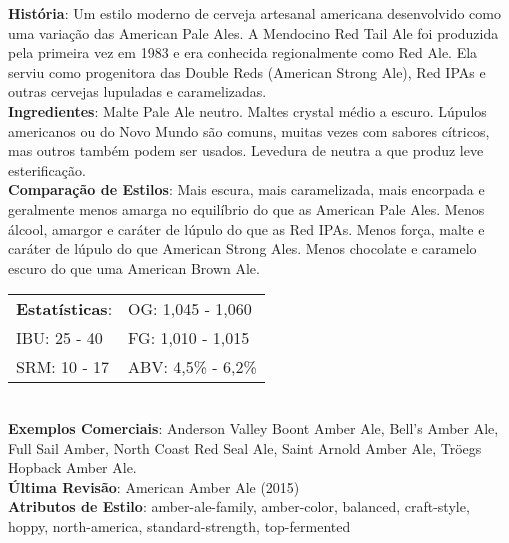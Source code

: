 \textbf{História}: Um estilo moderno de cerveja artesanal americana desenvolvido como uma variação das American Pale Ales. A Mendocino Red Tail Ale foi produzida pela primeira vez em 1983 e era conhecida regionalmente como Red Ale. Ela serviu como progenitora das Double Reds (American Strong Ale), Red IPAs e outras cervejas lupuladas e caramelizadas. \\
\textbf{Ingredientes}: Malte Pale Ale neutro. Maltes crystal médio a escuro. Lúpulos americanos ou do Novo Mundo são comuns, muitas vezes com sabores cítricos, mas outros também podem ser usados. Levedura de neutra a que produz leve esterificação. \\
\textbf{Comparação de Estilos}: Mais escura, mais caramelizada, mais encorpada e geralmente menos amarga no equilíbrio do que as American Pale Ales. Menos álcool, amargor e caráter de lúpulo do que as Red IPAs. Menos força, malte e caráter de lúpulo do que American Strong Ales. Menos chocolate e caramelo escuro do que uma American Brown Ale. \\
\begin{tabular}{@{}p{35mm}p{35mm}@{}}
  \textbf{Estatísticas}: & OG: 1,045 - 1,060 \\
  IBU: 25 - 40  & FG: 1,010 - 1,015  \\
  SRM: 10 - 17  & ABV: 4,5\% - 6,2\%
\end{tabular}\\
\textbf{Exemplos Comerciais}: Anderson Valley Boont Amber Ale, Bell’s Amber Ale, Full Sail Amber, North Coast Red Seal Ale, Saint Arnold Amber Ale, Tröegs Hopback Amber Ale. \\
\textbf{Última Revisão}: American Amber Ale (2015) \\
\textbf{Atributos de Estilo}: amber-ale-family, amber-color, balanced, craft-style, hoppy, north-america, standard-strength, top-fermented
